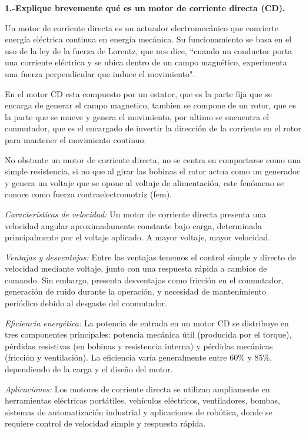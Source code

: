 \documentclass[letterpaper,12pt]{article}
\begin{document}
    

    \newpage
    \setcounter{page}{1} %

    \noindent\textbf{1.-Explique brevemente qué es un motor de corriente directa (CD). }

    Un motor de corriente directa es un actuador electromecánico que convierte energía eléctrica continua en energía mecánica.
    Su funcionamiento se basa en el uso de la ley de la fuerza de Lorentz, que nos dice, ``cuando un conductor porta una corriente eléctrica y se ubica dentro de un campo magnético, experimenta una fuerza perpendicular que induce el movimiento".

    En el motor CD esta compuesto por un estator, que es la parte fija que se encarga de generar el campo magnetico, tambien se compone de un rotor, que es la parte que se mueve y genera el movimiento, por ultimo se encuentra el conmutador, que es el encargado de invertir la dirección de la corriente en el rotor para mantener el movimiento continuo.

    No obstante un motor de corriente directa, no se centra en comportarse como una simple resistencia, si no que al girar las bobinas el rotor actua como un generador y genera un voltaje que se opone al voltaje de alimentación, este fenómeno se conoce como fuerza contraelectromotriz (fem).

    \textit{Características de velocidad:} Un motor de corriente directa presenta una velocidad angular aproximadamente constante bajo carga, determinada principalmente por el voltaje aplicado. A mayor voltaje, mayor velocidad.  

    \textit{Ventajas y desventajas:} Entre las ventajas tenemos el control simple y directo de velocidad mediante voltaje, junto con una respuesta rápida a cambios de comando. Sin embargo, presenta desventajas como fricción en el conmutador, generación de ruido durante la operación, y necesidad de mantenimiento periódico debido al desgaste del conmutador.

    \textit{Eficiencia energética:} La potencia de entrada en un motor CD se distribuye en tres componentes principales: potencia mecánica útil (producida por el torque), pérdidas resistivas (en bobinas y resistencia interna) y pérdidas mecánicas (fricción y ventilación). La eficiencia varía generalmente entre 60\% y 85\%, dependiendo de la carga y el diseño del motor.

    \textit{Aplicaciones:} Los motores de corriente directa se utilizan ampliamente en herramientas eléctricas portátiles, vehículos eléctricos, ventiladores, bombas, sistemas de automatización industrial y aplicaciones de robótica, donde se requiere control de velocidad simple y respuesta rápida.
    
\end{document}
